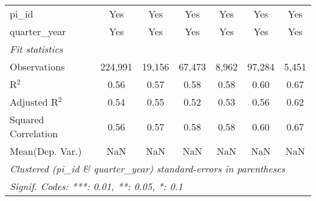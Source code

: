 \begin{tabular}{lcccccc}
   pi\_id                                                     & Yes           & Yes           & Yes           & Yes           & Yes           & Yes\\  
   quarter\_year                                              & Yes           & Yes           & Yes           & Yes           & Yes           & Yes\\  
   \midrule
   \emph{Fit statistics}\\
   Observations                                               & 224,991       & 19,156        & 67,473        & 8,962         & 97,284        & 5,451\\  
   R$^2$                                                      & 0.56          & 0.57          & 0.58          & 0.58          & 0.60          & 0.67\\  
   Adjusted R$^2$                                             & 0.54          & 0.55          & 0.52          & 0.53          & 0.56          & 0.62\\  
   Squared Correlation                                        & 0.56          & 0.57          & 0.58          & 0.58          & 0.60          & 0.67\\  
Mean(Dep. Var.) & NaN & NaN & NaN & NaN & NaN & NaN \\
   \midrule \midrule
   \multicolumn{7}{l}{\emph{Clustered (pi\_id \& quarter\_year) standard-errors in parentheses}}\\
   \multicolumn{7}{l}{\emph{Signif. Codes: ***: 0.01, **: 0.05, *: 0.1}}\\
\end{tabular}
\par\endgroup
